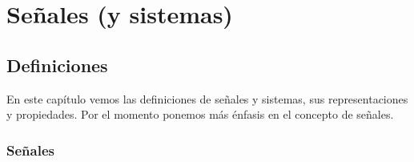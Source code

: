 \chapter{Se\~{n}ales (y sistemas)}

\section{Definiciones}




En este cap\'{i}tulo vemos las definiciones de se\~{n}ales y sistemas, sus
representaciones y propiedades. 
Por el momento ponemos m\'{a}s \'{e}nfasis en el concepto de se\~{n}ales.


\subsection{Se\~{n}ales}

